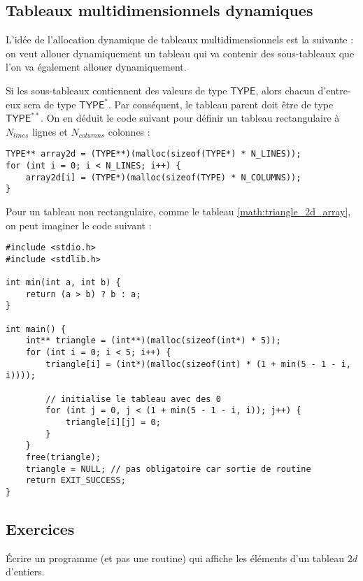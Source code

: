 \documentclass[../../../main.tex]{subfiles}
\begin{document}
\subsection{Tableaux multidimensionnels dynamiques}
\label{sub:tableaux_multidimensionnels_dynamiques}
L'idée de l'allocation dynamique de tableaux multidimensionnels est la suivante : on veut allouer dynamiquement un tableau qui va contenir des sous-tableaux que l'on va également allouer dynamiquement.
 
\begin{minipage}{\textwidth}
	\begin{center}
		
	\end{center}
\end{minipage}
 
Si les sous-tableaux contiennent des valeurs de type $\textsf{TYPE}$, alors chacun d'entre-eux sera de type $\textsf{TYPE}^{*}$. Par conséquent, le tableau parent doit être de type $\textsf{TYPE}^{**}$. On en déduit le code suivant pour définir un tableau rectangulaire à $N_{lines}$ lignes et $N_{columns}$ colonnes :
\begin{verbatim}
TYPE** array2d = (TYPE**)(malloc(sizeof(TYPE*) * N_LINES));
for (int i = 0; i < N_LINES; i++) {
	array2d[i] = (TYPE*)(malloc(sizeof(TYPE) * N_COLUMNS));
}
\end{verbatim}
Pour un tableau non rectangulaire, comme le tableau \ref{math:triangle_2d_array}, on peut imaginer le code suivant :
\begin{verbatim}
#include <stdio.h>
#include <stdlib.h>

int min(int a, int b) {
	return (a > b) ? b : a;
}

int main() {
	int** triangle = (int**)(malloc(sizeof(int*) * 5));
	for (int i = 0; i < 5; i++) {
		triangle[i] = (int*)(malloc(sizeof(int) * (1 + min(5 - 1 - i, i))));
		
		// initialise le tableau avec des 0
		for (int j = 0, j < (1 + min(5 - 1 - i, i)); j++) {
			triangle[i][j] = 0;
		}
	}
	free(triangle);
	triangle = NULL; // pas obligatoire car sortie de routine
	return EXIT_SUCCESS;
}
\end{verbatim}

\subsection{Exercices}
 Écrire un programme (et pas une routine) qui affiche les éléments d'un tableau $2d$ d'entiers.
\end{document}
